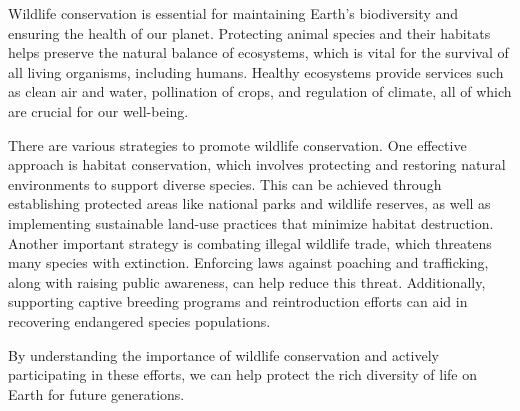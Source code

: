 \documentclass[12pt]{article}
\begin{document}
\begin{tcolorbox}[colframe=black!60, colback=white, 
coltitle=black, colbacktitle=black!15, fonttitle=\bfseries\Large, 
title=Text: Wildlife Conservation, halign title=center, left=10pt, right=10pt, top=10pt, bottom=15pt]
Wildlife conservation is essential for maintaining Earth's biodiversity and ensuring the health of our planet. Protecting animal species and their habitats helps preserve the natural balance of ecosystems, which is vital for the survival of all living organisms, including humans. Healthy ecosystems provide services such as clean air and water, pollination of crops, and regulation of climate, all of which are crucial for our well-being.

There are various strategies to promote wildlife conservation. One effective approach is habitat conservation, which involves protecting and restoring natural environments to support diverse species. This can be achieved through establishing protected areas like national parks and wildlife reserves, as well as implementing sustainable land-use practices that minimize habitat destruction. Another important strategy is combating illegal wildlife trade, which threatens many species with extinction. Enforcing laws against poaching and trafficking, along with raising public awareness, can help reduce this threat. Additionally, supporting captive breeding programs and reintroduction efforts can aid in recovering endangered species populations.

By understanding the importance of wildlife conservation and actively participating in these efforts, we can help protect the rich diversity of life on Earth for future generations.

 
 

 
\end{tcolorbox}
\vspace{2em}
\end{document}
